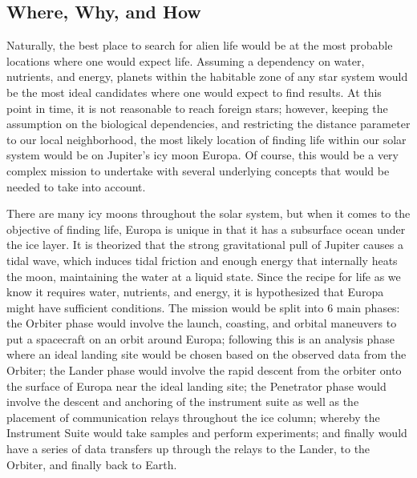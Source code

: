 \subsection{Where, Why, and How}
Naturally, the best place to search for alien life would be at the most probable locations where one would expect life. Assuming a dependency on water, nutrients, and energy, planets within the habitable zone of any star system would be the most ideal candidates where one would expect to find results. At this point in time, it is not reasonable to reach foreign stars; however, keeping the assumption on the biological dependencies, and restricting the distance parameter to our local neighborhood, the most likely location of finding life within our solar system would be on Jupiter's icy moon Europa. Of course, this would be a very complex mission to undertake with several underlying concepts that would be needed to take into account.

There are many icy moons throughout the solar system, but when it comes to the objective of finding life, Europa is unique in that it has a subsurface ocean under the ice layer. It is theorized that the strong gravitational pull of Jupiter causes a tidal wave, which induces tidal friction and enough energy that internally heats the moon, maintaining the water at a liquid state. Since the recipe for life as we know it requires water, nutrients, and energy, it is hypothesized that Europa might have sufficient conditions. The mission would be split into 6 main phases: the Orbiter phase would involve the launch, coasting, and orbital maneuvers to put a spacecraft on an orbit around Europa; following this is an analysis phase where an ideal landing site would be chosen based on the observed data from the Orbiter; the Lander phase would involve the rapid descent from the orbiter onto the surface of Europa near the ideal landing site; the Penetrator phase would involve the descent and anchoring of the instrument suite as well as the placement of communication relays throughout the ice column; whereby the Instrument Suite would take samples and perform experiments; and finally would have a series of data transfers up through the relays to the Lander, to the Orbiter, and finally back to Earth.

